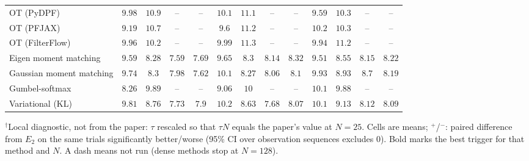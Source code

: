 \begin{table}[ht]
\begin{adjustbox}{max width=\linewidth}
\begin{tabular}{lcccc|cccc|cccc}
OT (PyDPF) & $9.98$ & $10.9$ & -- & -- & $10.1$ & $11.1$ & -- & -- & $\mathbf{9.59}$ & $\mathbf{10.3}$ & -- & -- \\
OT (PFJAX) & $\mathbf{9.19}$ & $10.7$ & -- & -- & $9.6$ & $11.2$ & -- & -- & $10.2$ & $\mathbf{10.3}$ & -- & -- \\
OT (FilterFlow) & $9.96$ & $\mathbf{10.2}$ & -- & -- & $9.99$ & $11.3$ & -- & -- & $\mathbf{9.94}$ & $11.2$ & -- & -- \\
Eigen moment matching & $9.59$ & $\mathbf{8.28}$ & $\mathbf{7.59}$ & $\mathbf{7.69}$ & $9.65$ & $8.3$ & $8.14$ & $8.32$ & $\mathbf{9.51}$ & $8.55$ & $8.15$ & $8.22$ \\
Gaussian moment matching & $\mathbf{9.74}$ & $8.3$ & $\mathbf{7.98}$ & $\mathbf{7.62}$ & $10.1$ & $\mathbf{8.27}$ & $8.06$ & $8.1$ & $9.93$ & $8.93$ & $8.7$ & $8.19$ \\
Gumbel-softmax & $\mathbf{8.26}$ & $9.89$ & -- & -- & $9.06$ & $10$ & -- & -- & $10.1$ & $\mathbf{9.88}$ & -- & -- \\
Variational (KL) & $\mathbf{9.81}$ & $8.76$ & $7.73$ & $\mathbf{7.9}$ & $10.2$ & $\mathbf{8.63}$ & $\mathbf{7.68}$ & $8.07$ & $10.1$ & $9.13$ & $8.12$ & $8.09$ \\
\bottomrule
\end{tabular}
\end{adjustbox}
\par\smallskip\parbox{0.95\linewidth}{\footnotesize $^\dagger$Local diagnostic, not from the paper: $\tau$ rescaled so that $\tau N$ equals the paper's value at $N{=}25$. Cells are means; $^{+}$/$^{-}$: paired difference from $E_2$ on the same trials significantly better/worse (95\% CI over observation sequences excludes 0). Bold marks the best trigger for that method and $N$. A dash means not run (dense methods stop at $N{=}128$).}
\end{table}

